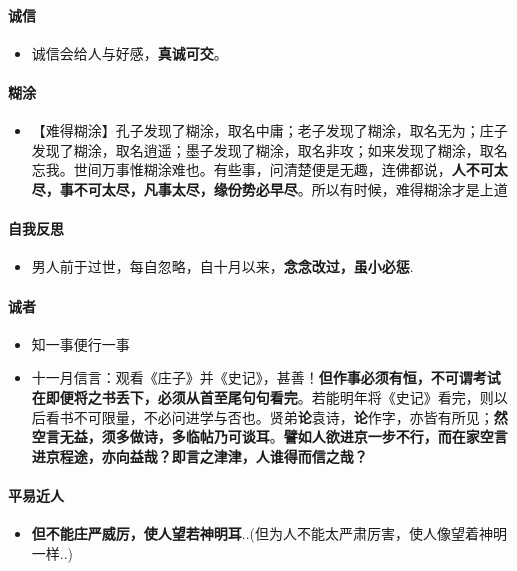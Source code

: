 \documentclass[UTF8,a4paper,8pt]{ctexbook}
\begin{document}
	    \paragraph{诚信}
		    \begin{itemize}
		    	\item  诚信会给人与好感，\textbf{真诚可交}。
		    \end{itemize}
	    
		\paragraph{糊涂}
			\begin{itemize}
				\item 【难得糊涂】孔子发现了糊涂，取名中庸；老子发现了糊涂，取名无为；庄子发现了糊涂，取名逍遥；墨子发现了糊涂，取名非攻；如来发现了糊涂，取名忘我。世间万事惟糊涂难也。有些事，问清楚便是无趣，连佛都说，\textbf{人不可太尽，事不可太尽，凡事太尽，缘份势必早尽}。所以有时候，难得糊涂才是上道 ​​
			\end{itemize}

		 \paragraph{自我反思} 
			 \begin{itemize}
			 	\item 男人前于过世，每自忽略，自十月以来，\textbf{念念改过，虽小必惩}.
			 \end{itemize}
		 
		 \paragraph{诚者}
			 \begin{itemize}
			 	\item 知一事便行一事
			 	\item 十一月信言：观看《庄子》并《史记》，甚善！\textbf{但作事必须有恒，不可谓考试在即便将之书丢下，必须从首至尾句句看完}。若能明年将《史记》看完，则以后看书不可限量，不必问进学与否也。贤弟\textbf{论}袁诗，\textbf{论}作字，亦皆有所见；\textbf{然空言无益，须多做诗，多临帖乃可谈耳}。\textbf{譬如人欲进京一步不行，而在家空言进京程途，亦向益哉？即言之津津，人谁得而信之哉？}
			 \end{itemize}
			  		 
		 \paragraph{平易近人}
			 \begin{itemize}
			 	\item \textbf{但不能庄严威厉，使人望若神明耳}..(但为人不能太严肃厉害，使人像望着神明一样..)
			 \end{itemize}
\end{document}
